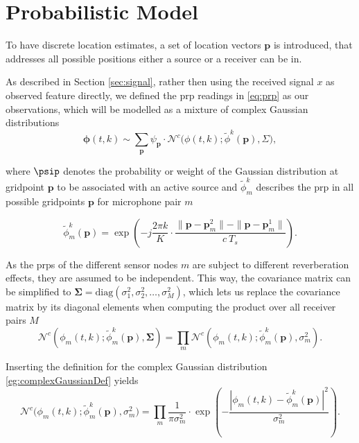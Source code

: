 \section{Probabilistic Model} \label{sec:prob_model}

To have discrete location estimates, a set of location vectors $\bm p$ is introduced, that addresses all possible positions either a source or a receiver can be in. %

As described in Section \ref{sec:signal}, rather then using the received signal $x$ as observed feature directly, we defined the \gls{prp} readings in \eqref{eq:prp} as our observations, which will be modelled as a mixture of complex Gaussian distributions
\begin{equation}
	\bm\phi(t,k)\sim\sum_{\bm p}\psi_{\bm p}\cdot\mathcal{N}^c\big(\phi(t,k);\tilde\phi^k(\bm p),\Sigma\big),
\label{eq:phi_gmm}
\end{equation}

where $\psip$ denotes the probability or weight of the Gaussian distribution at gridpoint $\bm p$ to be associated with an active source and $\tilde\phi^k_m$ describes the \gls{prp} in all possible gridpoints $\bm p$ for microphone pair $m$

\begin{equation}
    \tilde\phi^k_m(\bm p)=\exp{\left (-j\frac{2\pi k}{K}\cdot\frac{\|\bm p-\bm p^2_m\|-\|\bm p-\bm p^1_m\|}{c\ T_s}\right )}.
\label{eq:phi_tilde}
\end{equation}

As the \glspl{prp} of the different sensor nodes $m$ are subject to different reverberation effects, they are assumed to be independent. This way, the covariance matrix can be simplified to $\bm\Sigma=\text{diag}(\sigma^2_{1}, \sigma^2_{2}, \dots, \sigma^2_{M})$, which lets us replace the covariance matrix by its diagonal elements when computing the product over all receiver pairs $M$
\begin{equation}
    \mathcal{N}^c(\phi_m(t,k);\tilde\phi^k_m(\bm p),\bm\Sigma)=\prod_m \mathcal{N}^c(\phi_m(t,k);\tilde\phi^k_m(\bm p),\sigma^2_m).
\end{equation}

Inserting the definition for the complex Gaussian distribution \eqref{eg:complexGaussianDef} yields
\begin{equation}
    \mathcal{N}^c\big(\phi_m(t,k);\tilde\phi_m^k(\bm p),\sigma_{m}^2\big)=\prod_m\frac{1}{\pi\sigma_{m}^2}\cdot\exp\left (-\frac{\left|\phi_m(t,k)-\tilde\phi_m^k(\bm p)\right|^2}{\sigma_{m}^2} \right ).
\label{eq:gaussian}
\end{equation}


